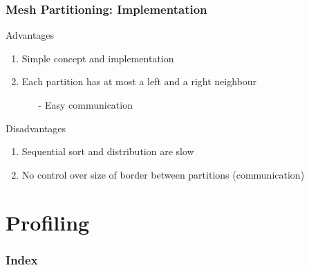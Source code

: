 \documentclass{beamer}
\begin{document}
\begin{frame}
\frametitle{Mesh Partitioning: Implementation}

	\begin{block}{Advantages}
		\begin{enumerate}\itemsep=10pt
			\item Simple concept and implementation
			\pause
			\item Each partition has at most a left and a right neighbour
			\begin{itemize}
				\item[-] Easy communication
			\end{itemize}
		\end{enumerate}
	\end{block}

	\pause
	\begin{block}{Disadvantages}
		\begin{enumerate}\itemsep=10pt
			\item Sequential sort and distribution are slow
			\pause
			\item No control over size of border between partitions (communication)
		\end{enumerate}
	\end{block}

\end{frame}



%
%
%
%

\section{Profiling}

\begin{frame}
	\frametitle{Index}
	\tableofcontents[currentsection]
\end{frame}
\end{document}
